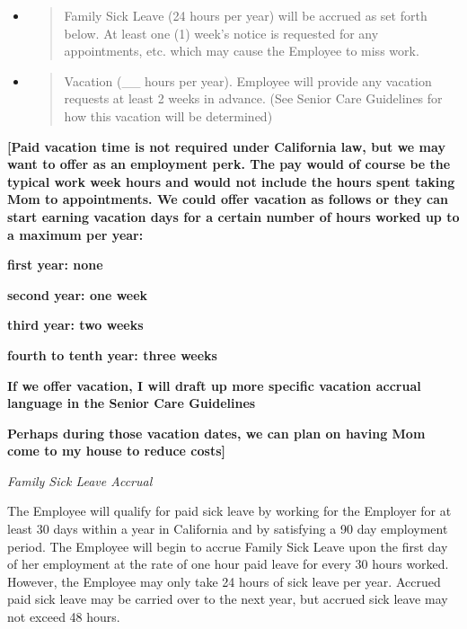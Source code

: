 \documentclass[]{article}
\begin{document}
\begin{itemize}
\item
  \begin{quote}
  Family Sick Leave (24 hours per year) will be accrued as set forth
  below. At least one (1) week's notice is requested for any
  appointments, etc. which may cause the Employee to miss work.
  \end{quote}
\end{itemize}

\begin{itemize}
\item
  \begin{quote}
  Vacation (\_\_ hours per year). Employee will provide any vacation
  requests at least 2 weeks in advance. (See Senior Care Guidelines for
  how this vacation will be determined)
  \end{quote}
\end{itemize}

\textbf{{[}Paid vacation time is not required under California law, but
we may want to offer as an employment perk. The pay would of course be
the typical work week hours and would not include the hours spent taking
Mom to appointments. We could offer vacation as follows or they can
start earning vacation days for a certain number of hours worked up to a
maximum per year: }

\textbf{first year: none}

\textbf{second year: one week}

\textbf{third year: two weeks}

\textbf{fourth to tenth year: three weeks }

\textbf{If we offer vacation, I will draft up more specific vacation
accrual language in the Senior Care Guidelines}

\textbf{Perhaps during those vacation dates, we can plan on having Mom
come to my house to reduce costs{]}}

\emph{Family Sick Leave Accrual}

The Employee will qualify for paid sick leave by working for the
Employer for at least 30 days within a year in California and by
satisfying a 90 day employment period. The Employee will begin to accrue
Family Sick Leave upon the first day of her employment at the rate of
one hour paid leave for every 30 hours worked. However, the Employee may
only take 24 hours of sick leave per year. Accrued paid sick leave may
be carried over to the next year, but accrued sick leave may not exceed
48 hours.
\end{document}
